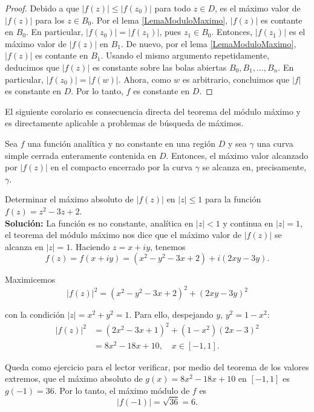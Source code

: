 \begin{proof}
Debido a que $|f(z)| \leq |f(z_0)|$ para todo $z \in D$,  es el máximo valor de $|f(z)|$ para los $z \in B_0$. Por el lema \ref{LemaModuloMaximo}, $|f(z)|$ es contante en $B_0$. En particular, $|f(z_0)| = |f(z_1)|$, pues $z_1 \in B_0$. Entonces, $|f(z_1)|$ es el máximo valor de $|f(z)|$ en $B_1$. De nuevo, por el lema \ref{LemaModuloMaximo}, $|f(z)|$ es contante en $B_1$. Usando el mismo argumento repetidamente, deducimos que $|f(z)|$ es constante sobre las bolas abiertas $B_0, B_1, \dots, B_n$. En particular, $|f(z_0)| = |f(w)|$. Ahora, como $w$ es arbitrario, concluimos que $|f|$ es constante en $D$. Por lo tanto, $f$ es constante en $D$.  
\end{proof}

El siguiente corolario es consecuencia directa del teorema del módulo máximo y es directamente aplicable a problemas de búsqueda de máximos.

\begin{corolario}
Sea $f$ una función analítica y no constante en una región $D$ y sea $\gamma$ una curva simple cerrada enteramente contenida en $D$. Entonces, el máximo valor alcanzado por $|f(z)|$ en el compacto encerrado por la curva $\gamma$ se alcanza en, precisamente,  $\gamma$.
\end{corolario}

\begin{ejemplo}
Determinar el máximo absoluto de $|f(z)|$ en $|z| \leq 1$ para la función $f(z) = z^2 -3z+2$.
\\

\textbf{Solución:} La función es no constante, analítica en $|z| < 1$ y continua en $|z| = 1$, el teorema del módulo máximo nos dice que el máximo valor de $|f(z)|$ se alcanza en $|z| = 1$. Haciendo $z = x+iy$, tenemos
$$f(z) = f(x+iy) = (x^2 - y^2 -3x+2) + i(2xy-3y).$$

Maximicemos
$$|f(z)|^2 = (x^2 - y^2 -3x+2)^2 + (2xy-3y)^2$$

con la condición $|z| = x^2+y^2 = 1$. Para ello, despejando $y$, $y^2 = 1-x^2$:
\begin{align*}
    |f(z)|^2 &= (2x^2 -3x+1)^2 + (1-x^2)(2x-3)^2 \\
    &= 8x^2 -18x+10, \quad x \in [-1,1].
\end{align*}

Queda como ejercicio para el lector verificar, por medio del teorema de los valores extremos, que el máximo absoluto de $g(x) = 8x^2 -18x+10 $ en $[-1,1]$ es $g(-1) = 36$. Por lo tanto, el máximo módulo de $f$ es
$$|f(-1)| = \sqrt{36} = 6.$$
\end{ejemplo}

